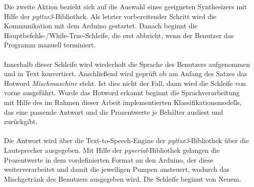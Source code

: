 Die zweite Aktion bezieht sich auf die Auswahl eines geeigneten Synthesizers mit Hilfe der \textit{pyttsx3}-Bibliothek. Als letzter vorbereitender Schritt wird die Kommunikation mit dem Arduino gestartet. Danach beginnt die Hauptbefehls-/While-True-Schleife, die erst abbricht, wenn der Benutzer das Programm manuell terminiert.\\\\
Innerhalb dieser Schleife wird wiederholt die Sprache des Benutzers aufgenommen und in Text konvertiert. Anschließend wird geprüft ob am Anfang des Satzes das Hotword \textit{Mischmaschine} steht. Ist dies nicht der Fall, dann wird die Schleife von vorne ausgeführt. Wurde das Hotword erkannt beginnt die Sprachverarbeitung mit Hilfe des im Rahmen dieser Arbeit implementierten Klassifikationsmodells, das eine passende Antwort und die Prozentwerte je Behälter ausliest und zurückgibt.\\\\
Die Antwort wird über die Text-to-Speech-Engine der \textit{pyttsx3}-Bibliothek über die Lautsprecher ausgegeben. Mit Hilfe der \textit{pyserial}-Bibliothek gelangen die Prozentwerte in dem vordefinierten Format an den Arduino, der diese weiterverarbeitet und damit die jeweiligen Pumpen ansteuert, wodurch das Mischgetränk des Benutzers ausgegeben wird. Die Schleife beginnt von Neuem. 
\endinput


